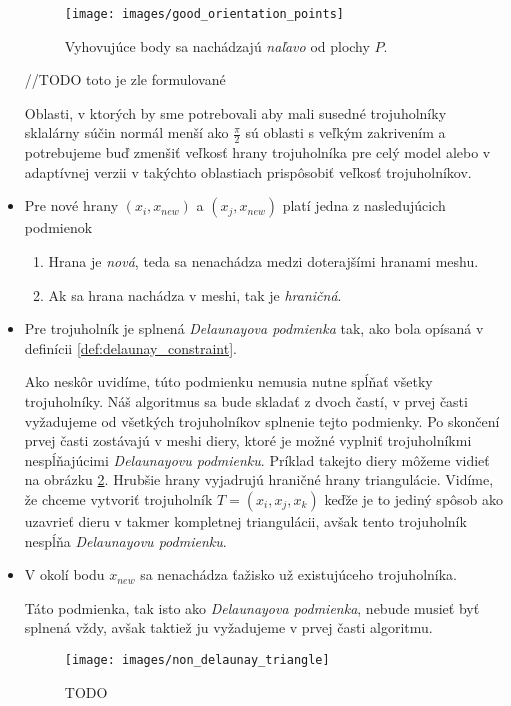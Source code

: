 \begin{itemize}
{        \begin{figure}
            \centerline{\texttt{[image: images/good\_orientation\_points]}}
            \caption[]{Vyhovujúce body sa nachádzajú \textit{naľavo} od plochy $P$.}
            \label{obr:good_orientation_points}
        \end{figure}


        //TODO toto je zle formulované

        Oblasti, v ktorých by sme potrebovali aby mali susedné trojuholníky sklalárny súčin normál menší ako 
        $\frac{\pi}{2}$ sú oblasti s veľkým zakrivením a potrebujeme buď zmenšiť veľkosť hrany trojuholníka
        pre celý model alebo v adaptívnej verzii v takýchto oblastiach prispôsobiť veľkosť trojuholníkov. 
    }

     \item{
         Pre nové hrany $(x_i, x_{new})$ a $(x_j, x_{new})$ platí jedna z nasledujúcich podmienok
         \begin{enumerate}
            \item {
                Hrana je \textit{nová}, teda sa nenachádza medzi doterajšími hranami meshu. 
            }
            \item {
                Ak sa hrana nachádza v meshi, tak je \textit{hraničná}.
            }
         \end{enumerate}
     }

     \item{
         Pre trojuholník je splnená \textit{Delaunayova podmienka} tak, ako bola opísaná v 
         definícii \ref{def:delaunay_constraint}.

        Ako neskôr uvidíme, túto podmienku nemusia nutne spĺňať všetky trojuholníky. Náš algoritmus sa bude 
        skladať z dvoch častí, v prvej časti vyžadujeme od všetkých trojuholníkov splnenie tejto podmienky.
        Po skončení prvej časti zostávajú v meshi diery, ktoré je možné vyplniť trojuholníkmi nespĺňajúcimi 
        \textit{Delaunayovu podmienku}. Príklad takejto diery môžeme vidieť na obrázku 
        \ref{obr:non_delaunay_triangle}. Hrubšie hrany vyjadrujú hraničné hrany triangulácie. 
        Vidíme, že chceme vytvoriť trojuholník $T = (x_i, x_j, x_k)$
        keďže je to jediný spôsob ako uzavrieť dieru v takmer kompletnej triangulácii,
        avšak tento trojuholník nespĺňa \textit{Delaunayovu podmienku}.
     }

     \item{
         V okolí bodu $x_{new}$ sa nenachádza ťažisko už existujúceho trojuholníka.

         Táto podmienka, tak isto ako \textit{Delaunayova podmienka}, nebude musieť byť splnená vždy,
         avšak taktiež ju vyžadujeme v prvej časti algoritmu.
     }
    \begin{figure}
        \centerline{\texttt{[image: images/non\_delaunay\_triangle]}}
        \caption[]{TODO}
        \label{obr:non_delaunay_triangle}
    \end{figure}
\end{itemize}

